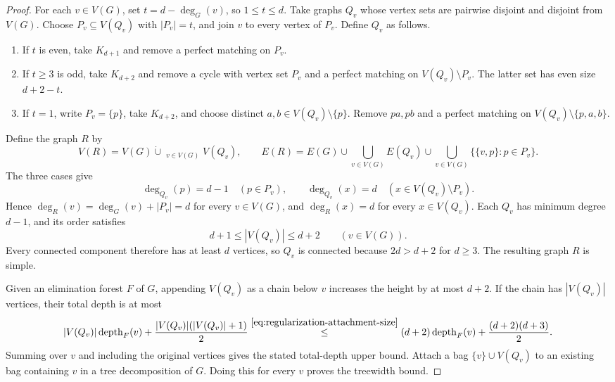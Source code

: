 \begin{proof}
For each $v\in V(G)$, set $t=d-\deg_G(v)$, so $1\le t\le d$.
Take graphs $Q_v$ whose vertex sets are pairwise disjoint and
disjoint from $V(G)$. Choose $P_v\subseteq V(Q_v)$ with $|P_v|=t$,
and join $v$ to every vertex of $P_v$. Define $Q_v$ as follows.
\begin{enumerate}
 \item If $t$ is even, take $K_{d+1}$ and remove a perfect matching
   on $P_v$.
 \item If $t\ge3$ is odd, take $K_{d+2}$ and remove a cycle with
   vertex set $P_v$ and a perfect matching on $V(Q_v)\setminus P_v$.
   The latter set has even size $d+2-t$.
 \item If $t=1$, write $P_v=\{p\}$, take $K_{d+2}$, and choose
   distinct $a,b\in V(Q_v)\setminus\{p\}$. Remove $pa,pb$ and a
   perfect matching on $V(Q_v)\setminus\{p,a,b\}$.
\end{enumerate}
Define the graph $R$ by
\[
V(R)=V(G)\mathbin{\dot\cup}
       \mathop{\dot\bigcup}_{v\in V(G)}V(Q_v),\qquad E(R)=E(G)\cup\bigcup_{v\in V(G)}E(Q_v)
       \cup\bigcup_{v\in V(G)}\{\{v,p\}:p\in P_v\}.
\]
The three cases give
\[
 \deg_{Q_v}(p)=d-1\quad(p\in P_v),\qquad
 \deg_{Q_v}(x)=d\quad(x\in V(Q_v)\setminus P_v).
\]
Hence $\deg_R(v)=\deg_G(v)+|P_v|=d$ for every $v\in V(G)$,
and $\deg_R(x)=d$ for every $x\in V(Q_v)$.
Each $Q_v$ has minimum degree $d-1$, and its order satisfies
\begin{equation}\label{eq:regularization-attachment-size}
 d+1\le |V(Q_v)|\le d+2\qquad(v\in V(G)).
\end{equation}
Every connected component therefore has at least $d$ vertices,
so $Q_v$ is connected because
$2d>d+2$ for $d\geq3$. The resulting graph $R$ is simple.

Given an elimination forest $F$ of $G$, appending $V(Q_v)$ as a chain
below $v$ increases the height by at
most $d+2$. If the chain has $|V(Q_v)|$ vertices, their total depth is
at most
\[
 |V(Q_v)|\operatorname{depth}_F(v)
 +\frac{|V(Q_v)|(|V(Q_v)|+1)}2
 \overset{\eqref{eq:regularization-attachment-size}}{\leq}
 (d+2)\operatorname{depth}_F(v)+\frac{(d+2)(d+3)}2.
\]
Summing over $v$ and including the original vertices gives the stated
total-depth upper bound. Attach a bag $\{v\}\cup V(Q_v)$ to an
existing bag containing $v$ in a tree decomposition of $G$.
Doing this for every $v$ proves the treewidth bound.


\end{proof}
